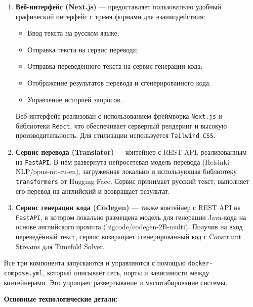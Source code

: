 \begin{enumerate}
    \item \textbf{Веб-интерфейс (Next.js)} — предоставляет пользователю удобный графический интерфейс с тремя формами для взаимодействия:
    \begin{itemize}
        \item Ввод текста на русском языке;
        \item Отправка текста на сервис перевода;
        \item Отправка переведённого текста на сервис генерации кода;
        \item Отображение результатов перевода и сгенерированного кода;
        \item Управление историей запросов.
    \end{itemize}

    Веб-интерфейс реализован с использованием фреймворка \texttt{Next.js} и библиотеки \texttt{React}, что обеспечивает серверный рендеринг и высокую производительность. Для стилизации используется \texttt{Tailwind CSS}.

    \item \textbf{Сервис перевода (Translator)} — контейнер с REST API, реализованным на \texttt{FastAPI}. В нём развернута нейросетевая модель перевода (Helsinki-NLP/opus-mt-ru-en), загруженная локально и использующая библиотеку \texttt{transformers} от Hugging Face. Сервис принимает русский текст, выполняет его перевод на английский и возвращает результат.

    \item \textbf{Сервис генерации кода (Codegen)} — также контейнер с REST API на \texttt{FastAPI}, в котором локально размещена модель для генерации Java-кода на основе английского промпта (bigcode/codegen-2B-multi). Получив на вход переведённый текст, сервис возвращает сгенерированный код с Constraint Streams для Timefold Solver.

\end{enumerate}

Все три компонента запускаются и управляются с помощью \texttt{docker-compose.yml}, который описывает сеть, порты и зависимости между контейнерами. Это упрощает развертывание и масштабирование системы.

\bigskip

\textbf{Основные технологические детали:}

